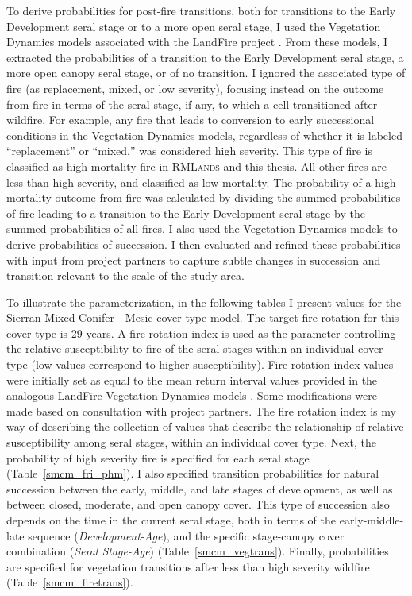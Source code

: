 To derive probabilities for post-fire transitions, both for transitions to the Early Development seral stage or to a more open seral stage, I used the Vegetation Dynamics models associated with the LandFire project \citep{Landfire2007}. From these models, I extracted the probabilities of a transition to the Early Development seral stage, a more open canopy seral stage, or of no transition. I ignored the associated type of fire (as replacement, mixed, or low severity), focusing instead on the outcome from fire in terms of the seral stage, if any, to which a cell transitioned after wildfire. For example, any fire that leads to conversion to early successional conditions in the Vegetation Dynamics models, regardless of whether it is labeled ``replacement'' or ``mixed,'' was considered high severity. This type of fire is classified as high mortality fire in \textsc{RMLands} and this thesis. All other fires are less than high severity, and classified as low mortality. The probability of a high mortality outcome from fire was calculated by dividing the summed probabilities of fire leading to a transition to the Early Development seral stage by the summed probabilities of all fires.  I also used the Vegetation Dynamics models to derive probabilities of succession. I then evaluated and refined these probabilities with input from project partners to capture subtle changes in succession and transition relevant to the scale of the study area.

To illustrate the parameterization, in the following tables I present values for the Sierran Mixed Conifer - Mesic cover type model. The target fire rotation for this cover type is 29 years. A fire rotation index is used as the parameter controlling the relative susceptibility to fire of the seral stages within an individual cover type (low values correspond to higher susceptibility). Fire rotation index values were initially set as equal to the mean return interval values provided in the analogous LandFire Vegetation Dynamics models \citep{Landfire2007}. Some modifications were made based on consultation with project partners. The fire rotation index is my way of describing the collection of values that describe the relationship of relative susceptibility among seral stages, within an individual cover type. Next, the probability of high severity fire is specified for each seral stage (Table~\ref{smcm_fri_phm}). I also specified transition probabilities for natural succession between the early, middle, and late stages of development, as well as between closed, moderate, and open canopy cover. This type of succession also depends on the time in the current seral stage, both in terms of the early-middle-late sequence (\emph{Development-Age}), and the specific stage-canopy cover combination (\emph{Seral Stage-Age}) (Table~\ref{smcm_vegtrans}). Finally, probabilities are specified for vegetation transitions after less than high severity wildfire (Table~\ref{smcm_firetrans}).

